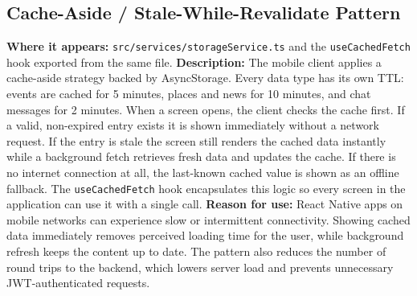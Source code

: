 \documentclass[12pt,a4paper]{article}
\begin{document}
\subsection{Cache-Aside / Stale-While-Revalidate Pattern}
\textbf{Where it appears:} \texttt{src/services/storageService.ts} and the
\texttt{useCachedFetch} hook exported from the same file.
\textbf{Description:} The mobile client applies a cache-aside strategy backed by
AsyncStorage. Every data type has its own TTL: events are cached for 5 minutes,
places and news for 10 minutes, and chat messages for 2 minutes. When a screen
opens, the client checks the cache first. If a valid, non-expired entry exists it is
shown immediately without a network request. If the entry is stale the screen still
renders the cached data instantly while a background fetch retrieves fresh data and
updates the cache. If there is no internet connection at all, the last-known cached
value is shown as an offline fallback. The \texttt{useCachedFetch} hook encapsulates
this logic so every screen in the application can use it with a single call.
\textbf{Reason for use:} React Native apps on mobile networks can experience slow or
intermittent connectivity. Showing cached data immediately removes perceived loading
time for the user, while background refresh keeps the content up to date. The
pattern also reduces the number of round trips to the backend, which lowers server
load and prevents unnecessary JWT-authenticated requests.
\end{document}
